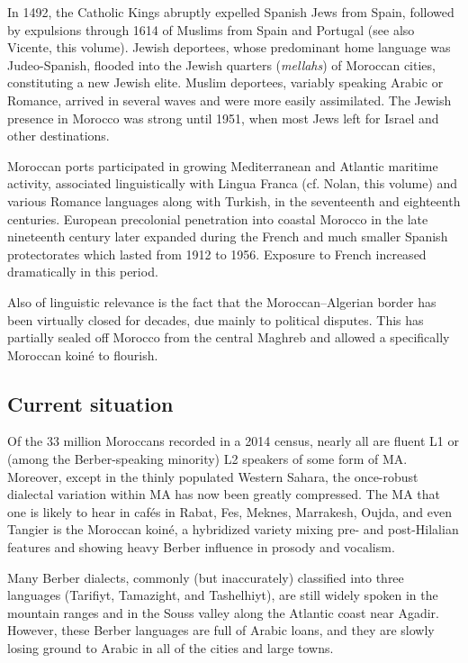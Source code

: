 \documentclass[output=paper]{langsci/langscibook}
\begin{document}
In 1492, the Catholic Kings abruptly expelled Spanish Jews from Spain, followed by expulsions through 1614 of Muslims from Spain and Portugal (see also Vicente, this volume). Jewish deportees, whose predominant home language was Judeo-Spanish, flooded into the Jewish quarters (\textit{mellahs}) of Moroccan cities, constituting a new Jewish elite. Muslim deportees, variably speaking Arabic or Romance, arrived in several waves and were more easily assimilated. The Jewish presence in Morocco was strong until 1951, when most Jews left for Israel and other destinations.

Moroccan ports participated in growing Mediterranean and Atlantic maritime activity, associated linguistically with Lingua Franca (cf. Nolan, this volume) and various Romance languages along with Turkish, in the seventeenth and eighteenth centuries. European precolonial penetration into coastal Morocco in the late nineteenth century later expanded during the French and much smaller Spanish protectorates which lasted from 1912 to 1956. Exposure to French increased dramatically in this period. 

Also of linguistic relevance is the fact that the Moroccan–Algerian border has been virtually closed for decades, due mainly to political disputes. This has partially sealed off Morocco from the central Maghreb and allowed a specifically Moroccan koiné to flourish.

\subsection{Current situation}

Of the 33 million Moroccans recorded in a 2014 census, nearly all are fluent L1 or (among the Berber-speaking minority) L2 speakers of some form of MA. Moreover, except in the thinly populated Western Sahara, the once-robust dialectal variation within MA has now been greatly compressed. The MA that one is likely to hear in cafés in Rabat, Fes, Meknes, Marrakesh, Oujda, and even Tangier is the Moroccan koiné, a hybridized variety mixing pre- and post-Hilalian features and showing heavy Berber influence in prosody and vocalism.

Many Berber dialects, commonly (but inaccurately) classified into three languages (Tarifiyt, Tamazight, and Tashelhiyt), are still widely spoken in the mountain ranges and in the Souss valley along the Atlantic coast near Agadir. However, these Berber languages are full of Arabic loans, and they are slowly losing ground to Arabic in all of the cities and large towns.
\end{document}
